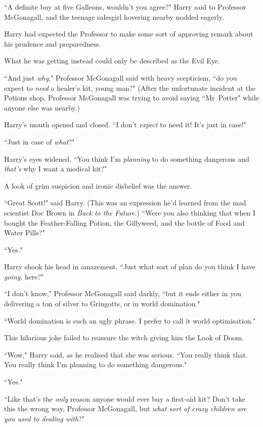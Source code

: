 ``A definite buy at five Galleons, wouldn't you agree?" Harry said to Professor McGonagall, and the teenage salesgirl hovering nearby nodded eagerly.

Harry had expected the Professor to make some sort of approving remark about his prudence and preparedness.

What he was getting instead could only be described as the Evil Eye.

``And just \emph{why}," Professor McGonagall said with heavy scepticism, ``do you expect to \emph{need} a healer's kit, young man?" (After the unfortunate incident at the Potions shop, Professor McGonagall was trying to avoid saying ``Mr~Potter" while anyone else was nearby.)

Harry's mouth opened and closed. ``I don't \emph{expect} to need it! It's just in case!"

``Just in case of \emph{what}?"

Harry's eyes widened. ``You think I'm \emph{planning} to do something dangerous and \emph{that's} why I want a medical kit?"

A look of grim suspicion and ironic disbelief was the answer.

``Great Scott!" said Harry. (This was an expression he'd learned from the mad scientist Doc Brown in \emph{Back to the Future}.) ``Were you also thinking that when I bought the Feather-Falling Potion, the Gillyweed, and the bottle of Food and Water Pills?"

``Yes."

Harry shook his head in amazement. ``Just what sort of plan do you think I have \emph{going}, here?"

``I don't know," Professor McGonagall said darkly, ``but it ends either in you delivering a ton of silver to Gringotts, or in world domination."

``World domination is such an ugly phrase. I prefer to call it world optimisation."

This hilarious joke failed to reassure the witch giving him the Look of Doom.

``Wow," Harry said, as he realised that she was serious. ``You really think that. You really think I'm planning to do something dangerous."

``Yes."

``Like that's the \emph{only} reason anyone would ever buy a first-aid kit? Don't take this the wrong way, Professor McGonagall, but \emph{what sort of crazy children are you used to dealing with}?"

